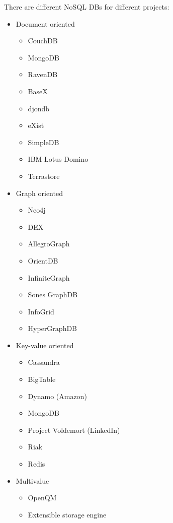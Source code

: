 There are different NoSQL DBs for different projects:

\begin{itemize}

\item Document oriented

  \begin{itemize}
    \item CouchDB
    \item MongoDB
    \item RavenDB
    \item BaseX
    \item djondb
    \item eXist
    \item SimpleDB
    \item IBM Lotus Domino
    \item Terrastore
  \end{itemize}

\item Graph oriented

  \begin{itemize}
    \item Neo4j
    \item DEX
    \item AllegroGraph
    \item OrientDB
    \item InfiniteGraph
    \item Sones GraphDB
    \item InfoGrid
    \item HyperGraphDB
  \end{itemize}

\item Key-value oriented

  \begin{itemize}
    \item Cassandra
    \item BigTable
    \item Dynamo (Amazon)
    \item MongoDB
    \item Project Voldemort (LinkedIn)
    \item Riak
    \item Redis
  \end{itemize}

\item Multivalue

  \begin{itemize}
    \item OpenQM
    \item Extensible storage engine
  \end{itemize}  


\end{itemize}
